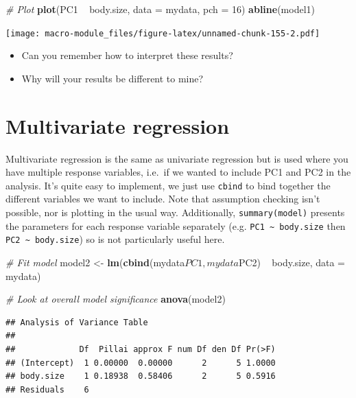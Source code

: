 \documentclass[]{book}
\newenvironment{Shaded}{\begin{snugshade}}{\end{snugshade}}
\newcommand{\KeywordTok}[1]{\textcolor[rgb]{0.13,0.29,0.53}{\textbf{{#1}}}}
\newcommand{\DataTypeTok}[1]{\textcolor[rgb]{0.13,0.29,0.53}{{#1}}}
\newcommand{\DecValTok}[1]{\textcolor[rgb]{0.00,0.00,0.81}{{#1}}}
\newcommand{\StringTok}[1]{\textcolor[rgb]{0.31,0.60,0.02}{{#1}}}
\newcommand{\CommentTok}[1]{\textcolor[rgb]{0.56,0.35,0.01}{\textit{{#1}}}}
\newcommand{\NormalTok}[1]{{#1}}
\providecommand{\tightlist}{%
  \setlength{\itemsep}{0pt}\setlength{\parskip}{0pt}}
\begin{document}
\begin{Shaded}
\begin{Highlighting}[]
\CommentTok{# Plot}
\KeywordTok{plot}\NormalTok{(PC1 ~}\StringTok{ }\NormalTok{body.size, }\DataTypeTok{data =} \NormalTok{mydata, }\DataTypeTok{pch =} \DecValTok{16}\NormalTok{)}
\KeywordTok{abline}\NormalTok{(model1)}
\end{Highlighting}
\end{Shaded}

\texttt{[image: macro-module\_files/figure-latex/unnamed-chunk-155-2.pdf]}

\begin{itemize}
\tightlist
\item
  Can you remember how to interpret these results?
\item
  Why will your results be different to mine?
\end{itemize}

\section{Multivariate regression}\label{multivariate-regression}

Multivariate regression is the same as univariate regression but is used
where you have multiple response variables, i.e.~if we wanted to include
PC1 and PC2 in the analysis. It's quite easy to implement, we just use
\texttt{cbind} to bind together the different variables we want to
include. Note that assumption checking isn't possible, nor is plotting
in the usual way. Additionally, \texttt{summary(model)} presents the
parameters for each response variable separately (e.g.
\texttt{PC1\ \textasciitilde{}\ body.size} then
\texttt{PC2\ \textasciitilde{}\ body.size}) so is not particularly
useful here.

\begin{Shaded}
\begin{Highlighting}[]
\CommentTok{# Fit model}
\NormalTok{model2 <-}\StringTok{ }\KeywordTok{lm}\NormalTok{(}\KeywordTok{cbind}\NormalTok{(mydata$PC1,mydata$PC2) ~}\StringTok{ }\NormalTok{body.size, }\DataTypeTok{data =} \NormalTok{mydata)}

\CommentTok{# Look at overall model significance}
\KeywordTok{anova}\NormalTok{(model2)}
\end{Highlighting}
\end{Shaded}

\begin{verbatim}
## Analysis of Variance Table
## 
##             Df  Pillai approx F num Df den Df Pr(>F)
## (Intercept)  1 0.00000  0.00000      2      5 1.0000
## body.size    1 0.18938  0.58406      2      5 0.5916
## Residuals    6
\end{verbatim}
\end{document}
